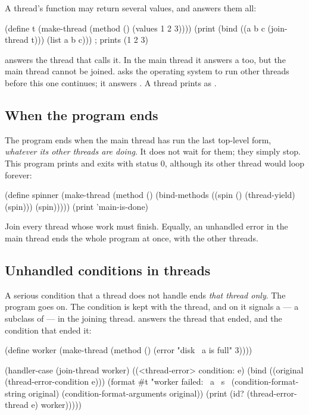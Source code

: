 A thread's function may return several values, and 
answers them all:

\begin{dylan}
(define t (make-thread (method () (values 1 2 3))))
(print (bind ((a b c (join-thread t))) (list a b c)))   ; prints (1 2 3)
\end{dylan}

 answers the thread that calls it. In the main
thread it answers a  too, but the main thread cannot be
joined.  asks the operating system to run other
threads before this one continues; it answers . A thread
prints as .

\subsection{When the program ends}\label{sec:ext-program-exit}

The program ends when the main thread has run the last top-level form,
\emph{whatever its other threads are doing}. It does not wait for them;
they simply stop. This program prints  and exits with
status 0, although its other thread would loop forever:

\begin{dylan}
(define spinner
  (make-thread
    (method ()
      (bind-methods ((spin () (thread-yield) (spin)))
        (spin)))))
(print 'main-is-done)
\end{dylan}

Join every thread whose work must finish. Equally, an unhandled error in
the main thread ends the whole program at once, with the other threads.

\subsection{Unhandled conditions in threads}\label{sec:ext-thread-errors}

A serious condition that a thread does not handle ends \emph{that thread
only}. The program goes on. The condition is kept with the thread, and
 on it signals a  --- a subclass
of  --- in the joining thread. 
answers the thread that ended, and  the
condition that ended it:

\begin{dylan}
(define worker (make-thread (method () (error "disk ~a is full" 3))))

(handler-case (join-thread worker)
  ((<thread-error> condition: e)
   (bind ((original (thread-error-condition e)))
     (format #t "worker failed: ~a ~s~%
             (condition-format-string original)
             (condition-format-arguments original))
     (print (id? (thread-error-thread e) worker)))))
\end{dylan}

